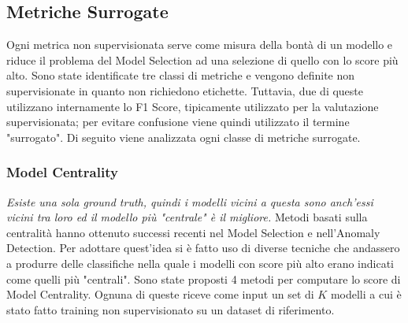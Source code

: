 \subsection{Metriche Surrogate}
Ogni metrica non supervisionata serve come misura della bontà di un modello e riduce il problema del Model Selection ad una selezione di quello con lo score più alto. 
Sono state identificate tre classi di metriche e vengono definite non supervisionate in quanto non richiedono etichette. Tuttavia, due di queste utilizzano internamente lo F1 Score, tipicamente utilizzato per la valutazione supervisionata; per evitare confusione viene quindi utilizzato il termine "surrogato".
Di seguito viene analizzata ogni classe di metriche surrogate. 


\subsubsection{Model Centrality}
\textit{Esiste una sola ground truth, quindi i modelli vicini a questa sono anch'essi vicini tra loro ed il modello più "centrale" è il migliore.}
Metodi basati sulla centralità hanno ottenuto successi recenti nel Model Selection e nell'Anomaly Detection. 
Per adottare quest'idea si è fatto uso di diverse tecniche che andassero a produrre delle classifiche nella quale i modelli con score più alto erano indicati come quelli più "centrali".
Sono state proposti 4 metodi per computare lo score di Model Centrality. Ognuna di queste riceve come input un set di $K$ modelli a cui è stato fatto training non supervisionato su un dataset di riferimento. 
